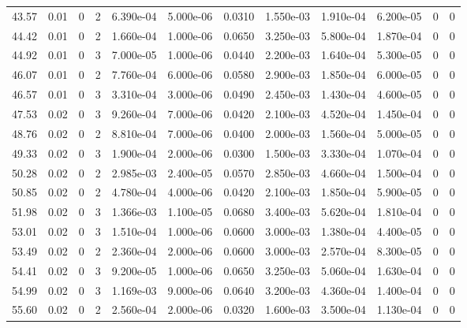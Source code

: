 \documentclass[preview]{standalone}
\begin{document}
{{{\begin{tabular}{L{1.2cm}C{1.2cm} C{0.3cm}C{0.5cm} C{1.4cm}C{1.4cm} C{1.4cm}C{1.4cm} C{1.6cm}C{1.6cm} C{1.6cm}C{1.6cm}}
  43.57  &  0.01  & 0     &  2 &  6.390e-04  & 5.000e-06  &  0.0310&   1.550e-03& 1.910e-04 & 6.200e-05   &  0 & 0  \\ 
  44.42  &  0.01  & 0     &  2 &  1.660e-04  & 1.000e-06  &  0.0650&   3.250e-03& 5.800e-04 & 1.870e-04   &  0 & 0  \\ 
  44.92  &  0.01  & 0     &  3 &  7.000e-05  & 1.000e-06  &  0.0440&   2.200e-03& 1.640e-04 & 5.300e-05   &  0 & 0  \\ 
  46.07  &  0.01  & 0     &  2 &  7.760e-04  & 6.000e-06  &  0.0580&   2.900e-03& 1.850e-04 & 6.000e-05   &  0 & 0  \\ 
  46.57  &  0.01  & 0     &  3 &  3.310e-04  & 3.000e-06  &  0.0490&   2.450e-03& 1.430e-04 & 4.600e-05   &  0 & 0  \\ 
  47.53  &  0.02  & 0     &  3 &  9.260e-04  & 7.000e-06  &  0.0420&   2.100e-03& 4.520e-04 & 1.450e-04   &  0 & 0  \\ 
  48.76  &  0.02  & 0     &  2 &  8.810e-04  & 7.000e-06  &  0.0400&   2.000e-03& 1.560e-04 & 5.000e-05   &  0 & 0  \\ 
  49.33  &  0.02  & 0     &  3 &  1.900e-04  & 2.000e-06  &  0.0300&   1.500e-03& 3.330e-04 & 1.070e-04   &  0 & 0  \\ 
  50.28  &  0.02  & 0     &  2 &  2.985e-03  & 2.400e-05  &  0.0570&   2.850e-03& 4.660e-04 & 1.500e-04   &  0 & 0  \\ 
  50.85  &  0.02  & 0     &  2 &  4.780e-04  & 4.000e-06  &  0.0420&   2.100e-03& 1.850e-04 & 5.900e-05   &  0 & 0  \\ 
  51.98  &  0.02  & 0     &  3 &  1.366e-03  & 1.100e-05  &  0.0680&   3.400e-03& 5.620e-04 & 1.810e-04   &  0 & 0  \\ 
  53.01  &  0.02  & 0     &  3 &  1.510e-04  & 1.000e-06  &  0.0600&   3.000e-03& 1.380e-04 & 4.400e-05   &  0 & 0  \\ 
  53.49  &  0.02  & 0     &  2 &  2.360e-04  & 2.000e-06  &  0.0600&   3.000e-03& 2.570e-04 & 8.300e-05   &  0 & 0  \\ 
  54.41  &  0.02  & 0     &  3 &  9.200e-05  & 1.000e-06  &  0.0650&   3.250e-03& 5.060e-04 & 1.630e-04   &  0 & 0  \\ 
  54.99  &  0.02  & 0     &  3 &  1.169e-03  & 9.000e-06  &  0.0640&   3.200e-03& 4.360e-04 & 1.400e-04   &  0 & 0  \\ 
  55.60  &  0.02  & 0     &  2 &  2.560e-04  & 2.000e-06  &  0.0320&   1.600e-03& 3.500e-04 & 1.130e-04   &  0 & 0  \\ 
\hline 
\end{tabular} 

}}}
\end{document}
